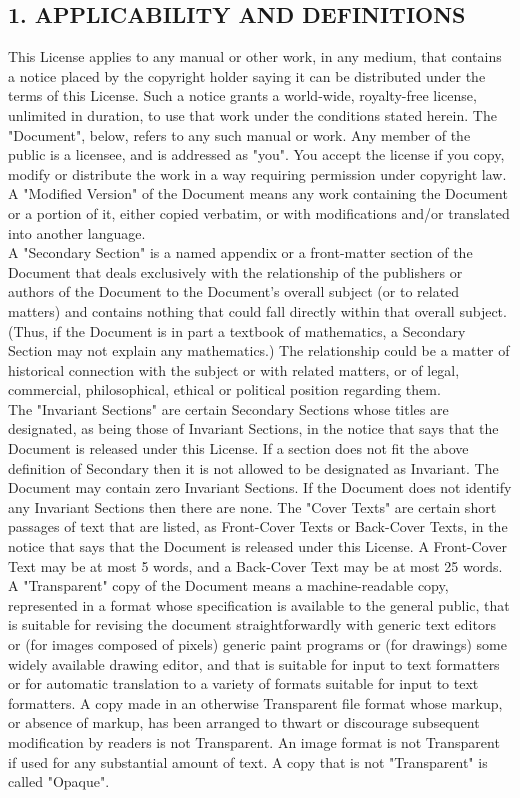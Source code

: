 \subsection{1. APPLICABILITY AND DEFINITIONS}


This License applies to any manual or other work, in any medium, that contains a notice placed by the copyright holder saying it can be distributed under the terms of this License. Such a notice grants a world-wide, royalty-free license, unlimited in duration, to use that work under the conditions stated herein. The "Document", below, refers to any such manual or work. Any member of the public is a licensee, and is addressed as "you". You accept the license if you copy, modify or distribute the work in a way requiring permission under copyright law.
A "Modified Version" of the Document means any work containing the Document or a portion of it, either copied verbatim, or with modifications and/or translated into another language.\\
A "Secondary Section" is a named appendix or a front-matter section of the Document that deals exclusively with the relationship of the publishers or authors of the Document to the Document's overall subject (or to related matters) and contains nothing that could fall directly within that overall subject. (Thus, if the Document is in part a textbook of mathematics, a Secondary Section may not explain any mathematics.) The relationship could be a matter of historical connection with the subject or with related matters, or of legal, commercial, philosophical, ethical or political position regarding them.\\
The "Invariant Sections" are certain Secondary Sections whose titles are designated, as being those of Invariant Sections, in the notice that says that the Document is released under this License. If a section does not fit the above definition of Secondary then it is not allowed to be designated as Invariant. The Document may contain zero Invariant Sections. If the Document does not identify any Invariant Sections then there are none.
The "Cover Texts" are certain short passages of text that are listed, as Front-Cover Texts or Back-Cover Texts, in the notice that says that the Document is released under this License. A Front-Cover Text may be at most 5 words, and a Back-Cover Text may be at most 25 words.\\
A "Transparent" copy of the Document means a machine-readable copy, represented in a format whose specification is available to the general public, that is suitable for revising the document straightforwardly with generic text editors or (for images composed of pixels) generic paint programs or (for drawings) some widely available drawing editor, and that is suitable for input to text formatters or for automatic translation to a variety of formats suitable for input to text formatters. A copy made in an otherwise Transparent file format whose markup, or absence of markup, has been arranged to thwart or discourage subsequent modification by readers is not Transparent. An image format is not Transparent if used for any substantial amount of text. A copy that is not "Transparent" is called "Opaque".\\
